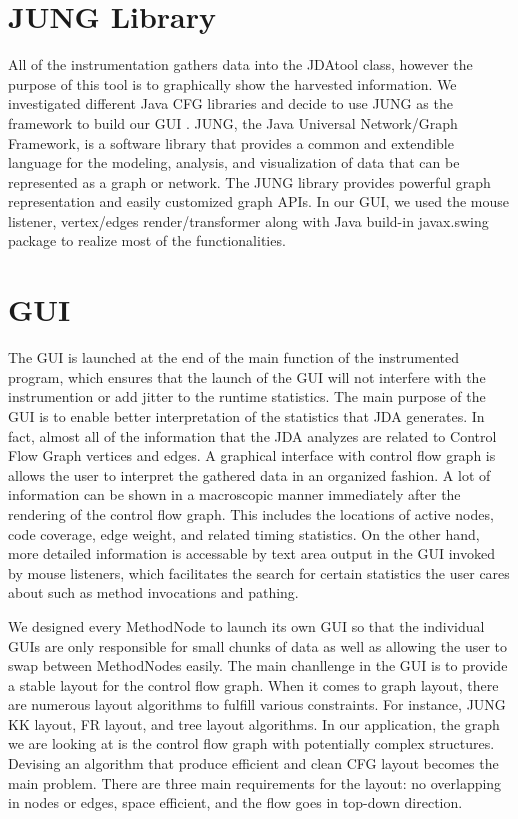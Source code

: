 \documentclass[conference,10pt,twocolumn]{./IEEE/IEEEtran}
\begin{document}
\section{JUNG Library}
All of the instrumentation gathers data into the JDAtool class, however the purpose of this tool is to graphically show the harvested information.
We investigated different Java CFG libraries and decide to use JUNG as the framework to build our GUI \cite{JUNG}.
JUNG, the Java Universal Network/Graph Framework, is a software library that provides a common and extendible language for the modeling, analysis, and visualization of data that can be represented as a graph or network.
The JUNG library provides powerful graph representation and easily customized graph APIs.
In our GUI, we used the mouse listener, vertex/edges render/transformer along with Java build-in javax.swing package to realize most of the functionalities. 

\section{GUI}
The GUI is launched at the end of the main function of the instrumented program, which ensures that the launch of the GUI will not interfere with the instrumention or add jitter to the runtime statistics.
The main purpose of the GUI is to enable better interpretation of the statistics that JDA generates.
In fact, almost all of the information that the JDA analyzes are related to Control Flow Graph vertices and edges.
A graphical interface with control flow graph is allows the user to interpret the gathered data in an organized fashion.
A lot of information can be shown in a macroscopic manner immediately after the rendering of the control flow graph. 
This includes the locations of active nodes, code coverage, edge weight, and related timing statistics.
On the other hand, more detailed information is accessable by text area output in the GUI invoked by mouse listeners, which facilitates the search for certain statistics the user cares about such as method invocations and pathing.

We designed every MethodNode to launch its own GUI so that the individual GUIs are only responsible for small chunks of data as well as allowing the user to swap between MethodNodes easily.
The main chanllenge in the GUI is to provide a stable layout for the control flow graph.
When it comes to graph layout, there are numerous layout algorithms to fulfill various constraints.
For instance, JUNG  KK layout, FR layout, and tree layout algorithms.
In our application, the graph we are looking at is the control flow graph with potentially complex structures.
Devising an algorithm that produce efficient and clean CFG layout becomes the main problem.
There are three main requirements for the layout: no overlapping in nodes or edges, space efficient, and the flow goes in top-down direction.
\end{document}
